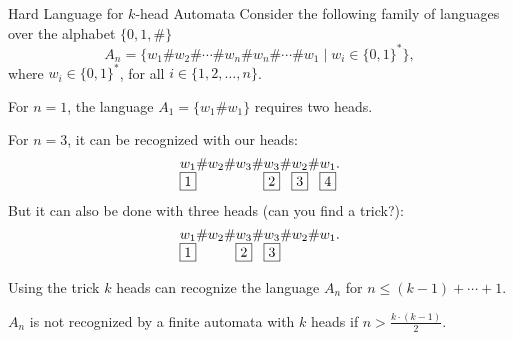\documentclass[aspectratio=169]{beamer}
\newcommand{\bits}{\{0,1\}}
\newcommand{\bitstr}{\bits^*}
\begin{document}
\begin{frame}[fragile]{Hard Language for $k$-head Automata}
    Consider the following family of languages over the alphabet $\{0,1,\#\}$
    \[
    A_n = \{w_1\#w_2\#\dotsb\#w_n\#w_n\#\dotsb\#w_1 \mid w_i \in \bitstr\},
    \]
    where $w_i \in \bitstr$, for all $i \in \{1,2,\dotsc,n\}$.

    For $n = 1$, the language $A_1 = \{w_1\#w_1\}$ requires two heads.\pause

    For $n = 3$, it can be recognized with our heads:
    \[
    \underset{\fbox{1}}{w_1}\#w_2\#w_3\#\underset{\fbox{2}}{w_3}\#\underset{\fbox{3}}{w_2}\#\underset{\fbox{4}}{w_1}.
    \]\pause
    But it can also be done with three heads (can you find a trick?):\pause
    \[
    \underset{\fbox{1}}{w_1}\#w_2\#\underset{\fbox{2}}{w_3}\#\underset{\fbox{3}}{w_3}\#w_2\#w_1.
    \]\pause

    Using the trick $k$ heads can recognize the language $A_n$ for $n \le (k-1) + \dotsb + 1$.
    \begin{lemma}
        $A_n$ is not recognized by a finite automata with $k$ heads if $n > \frac{k \cdot (k-1)}{2}$.
    \end{lemma}
\end{frame}
\end{document}
